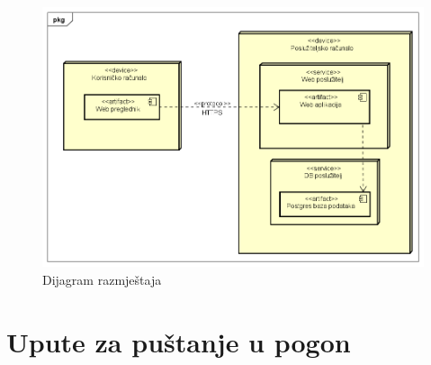 			
			 \begin{figure}[H]
				\includegraphics[width=\textwidth]{slike/dijagramRazmjestaja.PNG} %
				\caption{Dijagram razmještaja}
				\label{fig:dijagramRazmjestaja} %
			\end{figure}
			
			
			\eject 
		
		\section{Upute za puštanje u pogon}
		
